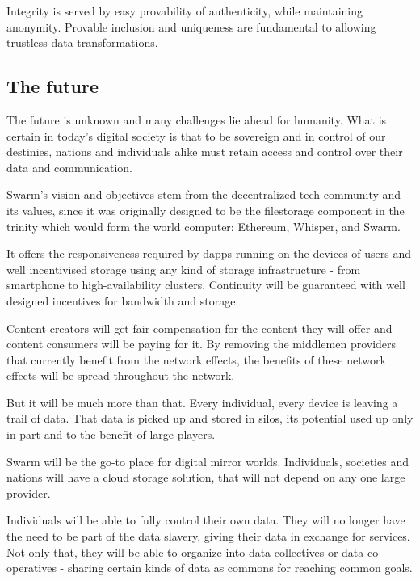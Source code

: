 Integrity is served by easy provability of authenticity, while maintaining anonymity.
Provable inclusion and uniqueness are fundamental to allowing trustless data transformations.


\subsection{The future} \label{sec:future}

The future is unknown and many challenges lie ahead for humanity. What is certain in today's digital society is that to be sovereign and in control of our destinies, nations and individuals alike must retain access and control over their data and communication.

Swarm's vision and objectives stem from the decentralized tech community and its values, since it was originally designed to be the filestorage component in the trinity which would form the world computer: Ethereum, Whisper, and Swarm.

It offers the responsiveness required by dapps running on the devices of users and well incentivised storage using any kind of storage infrastructure - from smartphone to high-availability clusters. Continuity will be guaranteed with well designed incentives for bandwidth and storage.

Content creators will get fair compensation for the content they will offer and content consumers will be paying for it. By removing the middlemen providers that currently benefit from the network effects, the benefits of these network effects will be spread throughout the network.

But it will be much more than that. Every individual, every device is leaving a trail of data. That data is picked up and stored in silos, its potential used up only in part and to the benefit of large players.

Swarm will be the go-to place for digital mirror worlds. Individuals, societies and nations will have a cloud storage solution, that will not depend on any one large provider. 


Individuals will be able to fully control their own data. They will no longer have the need to be part of the data slavery, giving their data in exchange for services. Not only that, they will be able to organize into data collectives or data co-operatives - sharing certain kinds of data as commons for reaching common goals. 

